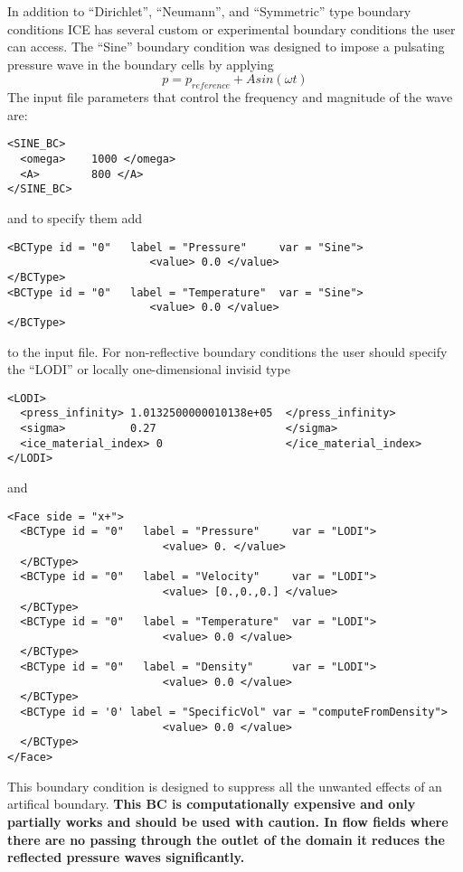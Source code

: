 %
In addition to ``Dirichlet'', ``Neumann'', and ``Symmetric'' type boundary
conditions ICE has several custom or experimental  boundary conditions the user can
access.  The ``Sine'' boundary condition was designed to impose a pulsating
pressure wave in the boundary cells by applying
%
\begin{equation} \label{eq:pSine}
  p = p_{reference} + A  sin(\omega t)
\end{equation}
%
The input file parameters that control the frequency and magnitude of the  wave are: 
\begin{Verbatim}[fontsize=\footnotesize]
<SINE_BC>
  <omega>    1000 </omega>
  <A>        800 </A>
</SINE_BC>
\end{Verbatim}
and to specify them add
\begin{Verbatim}[fontsize=\footnotesize]
<BCType id = "0"   label = "Pressure"     var = "Sine"> 
                      <value> 0.0 </value> 
</BCType> 
<BCType id = "0"   label = "Temperature"  var = "Sine"> 
                      <value> 0.0 </value>
</BCType>
\end{Verbatim}
%
to the input file.
%
For non-reflective boundary conditions the user should specify the ``LODI''
or locally one-dimensional invisid type \cite{ref:Sutherland}

\begin{Verbatim}[fontsize=\footnotesize]
<LODI>
  <press_infinity> 1.0132500000010138e+05  </press_infinity>
  <sigma>          0.27                    </sigma>
  <ice_material_index> 0                   </ice_material_index>
</LODI>
\end{Verbatim}
%
and
%
\begin{Verbatim}[fontsize=\footnotesize]
<Face side = "x+">
  <BCType id = "0"   label = "Pressure"     var = "LODI">
                        <value> 0. </value>                
  </BCType>
  <BCType id = "0"   label = "Velocity"     var = "LODI">
                        <value> [0.,0.,0.] </value>
  </BCType>
  <BCType id = "0"   label = "Temperature"  var = "LODI">
                        <value> 0.0 </value>
  </BCType>
  <BCType id = "0"   label = "Density"      var = "LODI">
                        <value> 0.0 </value>
  </BCType>
  <BCType id = '0' label = "SpecificVol" var = "computeFromDensity">
                        <value> 0.0 </value>
  </BCType>
</Face> 
\end{Verbatim}
%
This boundary condition is designed to suppress all the unwanted effects of an
artifical boundary. \bf This BC is computationally expensive and only partially
works and should be used with caution\normalfont.  In flow fields where
there are no passing through the outlet of the domain it reduces
the reflected pressure waves significantly.
